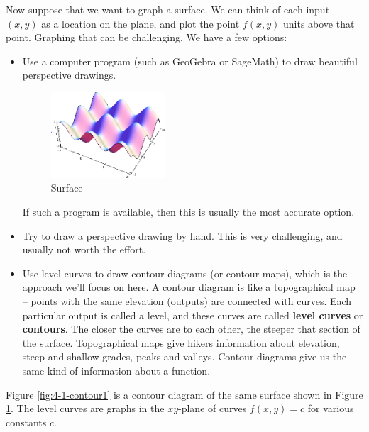 Now suppose that we want to graph a surface. We can think of each input $(x,y)$ as a location on the plane, and plot the point $f(x,y)$ units above that point. Graphing that can be challenging. We have a few options:
  \begin{itemize}
    \item Use a computer program (such as GeoGebra or SageMath) to draw beautiful perspective drawings.

\begin{figure}[!ht]
  \centering
    \includegraphics[width=0.4\textwidth]{img/chap4/image014.png}
    \caption{Surface}
    \label{fig:4-1-surface}
  \end{figure}
If such a program is available, then this is usually the most accurate option.

  \item Try to draw a perspective drawing by hand. This is very challenging, and usually not worth the effort.
  \item Use level curves to draw contour diagrams (or contour maps), which is the approach we'll focus on here. A contour diagram is like a topographical map -- points with the same elevation (outputs) are connected with curves. Each particular output is called a level, and these curves are called {\bf level curves} or {\bf contours}. The closer the curves are to each other, the steeper that section of the surface. Topographical maps give hikers information about elevation, steep and shallow grades, peaks and valleys. Contour diagrams give us the same kind of information about a function.
\end{itemize}
Figure \ref{fig:4-1-contour1} is a contour diagram of the same surface shown in Figure \ref{fig:4-1-surface}. The level curves are graphs in the $xy$-plane of curves $f(x,y)=c$ for various constants $c$.

